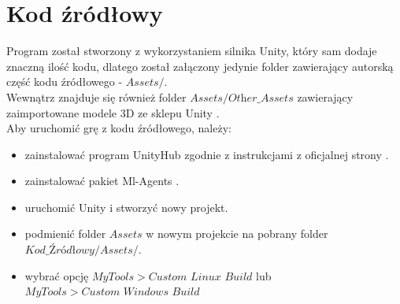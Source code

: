 \section{Kod źródłowy}
    Program został stworzony z wykorzystaniem silnika Unity, który sam dodaje znaczną ilość kodu, 
    dlatego został załączony jedynie folder zawierający autorską część kodu źródłowego - $\textit{Assets/}$. \\
    Wewnątrz znajduje się również folder $\textit{Assets/Other\_Assets}$ zawierający zaimportowane modele 3D 
    ze sklepu Unity \cite{UnityAssetStore}.\\
    Aby uruchomić grę z kodu źródłowego, należy:
    \begin{itemize}
        \item zainstalować program UnityHub zgodnie z instrukcjami z oficjalnej strony \cite{UnityInstallation}.
        \item zainstalować pakiet Ml-Agents \cite{UnityMlAgentsInstallation}.
        \item uruchomić Unity i stworzyć nowy projekt.
        \item podmienić folder $Assets$ w nowym projekcie na pobrany folder $\textit{Kod\_Źródłowy/Assets/}$.
        \item wybrać opcję $MyTools > \textit{Custom Linux Build}$ lub $MyTools > \textit{Custom Windows Build}$
    \end{itemize}
\phantom{.} \vspace{4cm}\\
